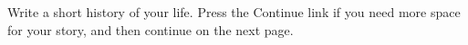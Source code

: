 \documentclass{article}
\begin{document}
\noindent
{}\medskip

\noindent
\lipsum[1-4]\medskip

\noindent
Write a short history of your life. Press the \textsf{Continue} link if you need more space for your story, and then continue on the
next page.\medskip

\noindent
{}\\[6bp]\null
\hfill{}

\newpage
\noindent\lipsum[5-10]
\end{document}
